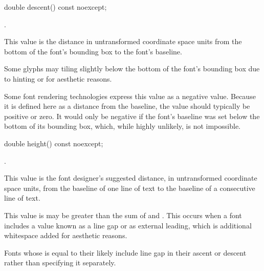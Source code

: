\begin{itemdecl}
    double descent() const noexcept;
\end{itemdecl}
\begin{itemdescr}
	\pnum
	\returns
	.
	
	\pnum
	\remarks
	This value is the distance in untransformed coordinate space units from the bottom of the font's bounding box to the font's baseline.
	
	\pnum
	Some glyphs may tiling slightly below the bottom of the font's bounding box due to hinting or for aesthetic reasons.
	
	\pnum
	\enternote
	Some font rendering technologies express this value as a negative value. Because it is defined here as a distance from the baseline, the value should typically be positive or zero. It would only be negative if the font's baseline was set below the bottom of its bounding box, which, while highly unlikely, is not impossible.
	\exitnote

\end{itemdescr}

\begin{itemdecl}
    double height() const noexcept;
\end{itemdecl}
\begin{itemdescr}
	\pnum
	\returns
	.
	
	\pnum
	\remarks
	This value is the font designer's suggested distance, in untransformed coordinate space units, from the baseline of one line of text to the baseline of a consecutive line of text.
	
	\pnum
	This value is may be greater than the sum of  and . This occurs when a font includes a value known as a line gap or as external leading, which is additional whitespace added for aesthetic reasons.
	
	\pnum	
	Fonts whose  is equal to their  likely include line gap in their ascent or descent rather than specifying it separately.

\end{itemdescr}
